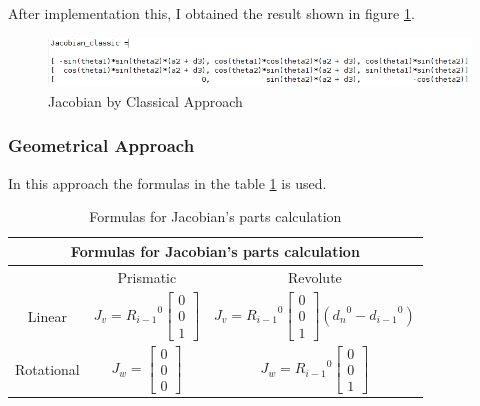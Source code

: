 \documentclass[12pt, a4paper]{report}
\begin{document}
After implementation this, I obtained the result shown in figure \ref{fig:mesh5}.

\begin{figure}[H]
	\centering
		\includegraphics[width=1.0\textwidth]{Image5} %
	\caption{Jacobian by Classical Approach} %
	\label{fig:mesh5}
\end{figure}


{\centering
\subsubsection*{Geometrical Approach}
}

In this approach the formulas in the table \ref{table:1} is used.

\begin{table}[H]
\centering
\begin{tabular}{ |c||c||c|}
 \hline
 \multicolumn{3}{|c|}{Formulas for Jacobian's parts calculation} \\
 \hline
  & Prismatic & Revolute \\
 \hline
 Linear & $
        J_v ={R_{i-1}}^0
        \begin{bmatrix}
                0\\
               0\\
                1
        \end{bmatrix}$ 
& $
        J_v ={R_{i-1}}^0
        \begin{bmatrix}
                0\\
               0\\
                1
        \end{bmatrix}({d_{n}}^0-{d_{i-1}}^0)$ \\
 Rotational & $
        J_w =
        \begin{bmatrix}
                0\\
               0\\
                0
        \end{bmatrix}$  & $
        J_w ={R_{i-1}}^0
        \begin{bmatrix}
                0\\
               0\\
                1
        \end{bmatrix}$ \\
 \hline
\end{tabular}
\caption{Formulas for Jacobian's parts calculation}
\label{table:1}
\end{table}
\end{document}
